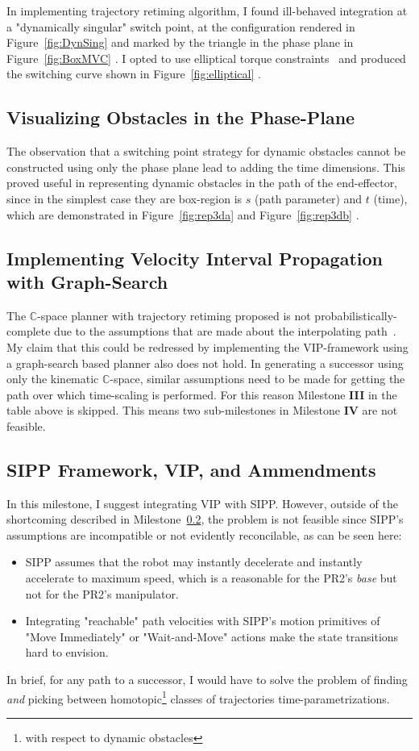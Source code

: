 \documentclass[letterpaper,11pt]{article} %
\newcommand{\reffig}[1]
{
Figure~\ref{fig:#1}
}
\begin{document}
In implementing trajectory retiming algorithm, I found ill-behaved integration at a "dynamically singular" switch point, at the configuration rendered in\reffig{DynSing} and marked by the triangle in the phase plane in \reffig{BoxMVC}. I opted to use elliptical torque constraints~\cite{shiller1992computation} and produced the switching curve shown in\reffig{elliptical}.

\subsection{Visualizing Obstacles in the Phase-Plane}

The observation that a switching point strategy for dynamic obstacles cannot be constructed using only the phase plane lead to adding the time dimensions. This proved useful in representing dynamic obstacles in the path of the end-effector, since in the simplest case they are box-region is $s$ (path parameter) and $t$ (time), which are demonstrated in\reffig{rep3da} and\reffig{rep3db}.

\subsection{Implementing Velocity Interval Propagation with Graph-Search}\label{subsec:vip}

The $\mathbb{C}$-space planner with trajectory retiming proposed is not probabilistically-complete due to the assumptions that are made about the interpolating path~\cite{pham2013velocity}. My claim that this could be redressed by implementing the VIP-framework using a graph-search based planner also does not hold. In generating a successor using only the kinematic $\mathbb{C}$-space, similar assumptions need to be made for getting the path over which time-scaling is performed. For this reason Milestone \textbf{III} in the table above is skipped. This means two sub-milestones in Milestone \textbf{IV} are not feasible.

\subsection{SIPP Framework, VIP, and Ammendments}\label{subsec:ammend}

In this milestone, I suggest integrating VIP with SIPP. However, outside of the shortcoming described in Milestone~\ref{subsec:vip}, the problem is not feasible since SIPP's assumptions are incompatible or not evidently reconcilable, as can be seen here:
\begin{itemize}
\item SIPP assumes that the robot may instantly decelerate and instantly accelerate to maximum speed, which is a reasonable for the PR2's \emph{base} but not for the PR2's manipulator. 
\item Integrating "reachable" path velocities with SIPP's motion primitives of "Move Immediately" or "Wait-and-Move" actions make the state transitions hard to envision.
\end{itemize} 
In brief, for any path to a successor, I would have to solve the problem of finding \emph{and} picking between homotopic\footnote{with respect to dynamic obstacles} classes of trajectories time-parametrizations.
\end{document}
